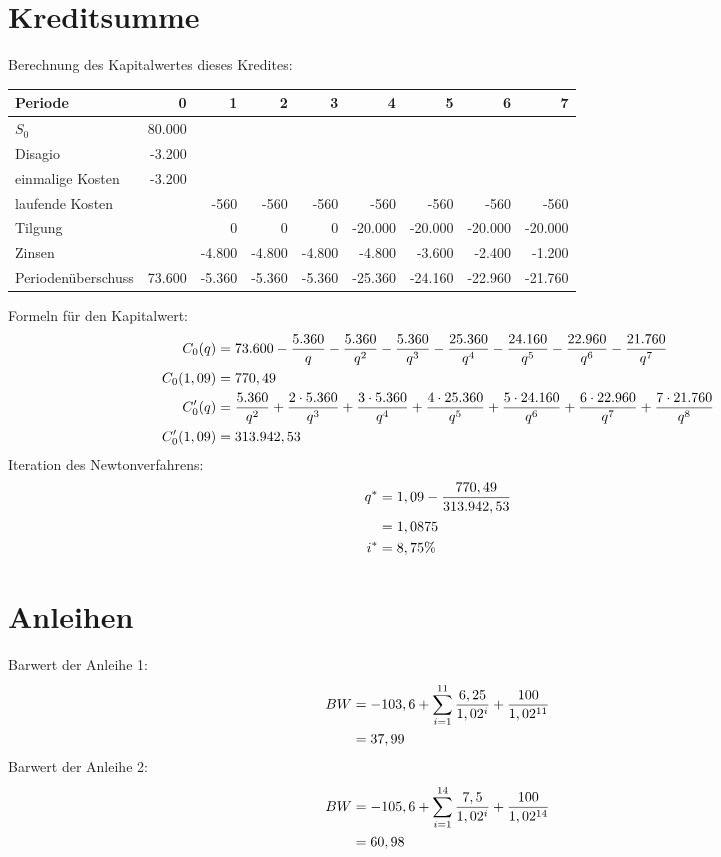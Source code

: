 \documentclass{article}
\begin{document}
	\section*{Kreditsumme}
	Berechnung des Kapitalwertes dieses Kredites:
	\begin{center}
		\begin{tabular}{l|r|r|r|r|r|r|r|r}
			Periode & 0 & 1 & 2 & 3 & 4 & 5 & 6 & 7 \\
			\hline
			$S_0$ & 80.000 & & & & & & & \\
			\hline
			Disagio & -3.200 & & & & & & & \\
			\hline
			einmalige Kosten & -3.200 & & & & & & & \\
			\hline
			laufende Kosten & & -560 & -560 & -560 & -560 & -560 & -560 & -560 \\
			\hline
			Tilgung & & 0 & 0 & 0 & -20.000 & -20.000 & -20.000 & -20.000 \\
			\hline
			Zinsen & & -4.800 & -4.800 & -4.800 & -4.800 & -3.600 & -2.400 & -1.200 \\
			\hline
			Periodenüberschuss & 73.600 & -5.360 & -5.360 & -5.360 & -25.360 & -24.160 & -22.960 & -21.760
		\end{tabular}
	\end{center}
	Formeln für den Kapitalwert:
	\begin{align}
		C_0(q) &= 73.600 - \frac{5.360}{q} - \frac{5.360}{q^2} - \frac{5.360}{q^3} - \frac{25.360}{q^4} - \frac{24.160}{q^5} - \frac{22.960}{q^6} - \frac{21.760}{q^7} \notag \\
		C_0(1,09) &= 770,49 \notag \\
		C'_0(q) &= \frac{5.360}{q^2} + \frac{2\cdot 5.360}{q^3} + \frac{3\cdot 5.360}{q^4} + \frac{4\cdot 25.360}{q^5} + \frac{5\cdot 24.160}{q^6} + \frac{6\cdot 22.960}{q^7} + \frac{7\cdot 21.760}{q^8} \notag \\
		C'_0(1,09) &= 313.942,53 \notag
	\end{align}
	Iteration des Newtonverfahrens:
	\begin{align}
		q^\ast &= 1,09 - \frac{770,49}{313.942,53} \notag \\
		&= 1,0875 \notag \\
		i^\ast &= 8,75\% \notag
	\end{align}
	
	\section*{Anleihen}
	Barwert der Anleihe 1:
	\begin{align}
		BW &= -103,6 + \sum_{i=1}^{11} \frac{6,25}{1,02^i} + \frac{100}{1,02^{11}} \notag \\
		&= 37,99 \notag
	\end{align}
	Barwert der Anleihe 2:
	\begin{align}
		BW &= -105,6 + \sum_{i=1}^{14} \frac{7,5}{1,02^i} + \frac{100}{1,02^{14}} \notag \\
		&= 60,98 \notag
	\end{align}
	
\end{document}
